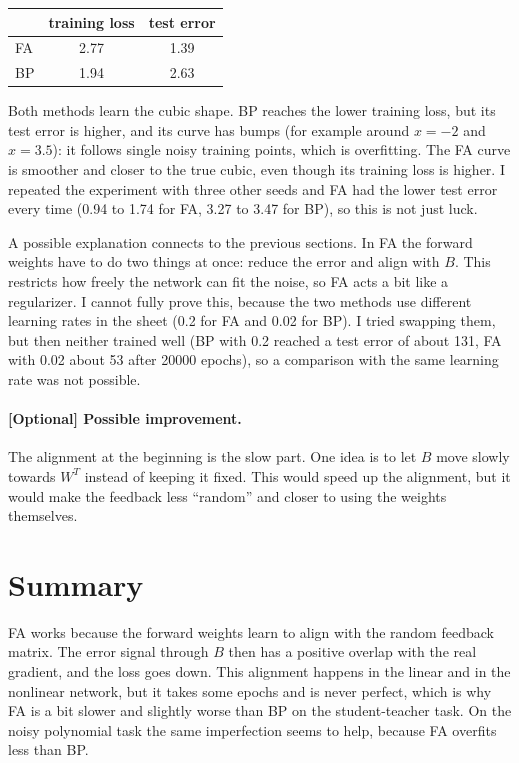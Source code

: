 \documentclass{article}
\begin{document}
\begin{center}
\begin{tabular}{lcc}
\toprule
 & training loss & test error \\
\midrule
FA & 2.77 & 1.39 \\
BP & 1.94 & 2.63 \\
\bottomrule
\end{tabular}
\end{center}

Both methods learn the cubic shape. BP reaches the lower training loss, but its test error is higher, and its curve has bumps (for example around $x=-2$ and $x=3.5$): it follows single noisy training points, which is overfitting. 
The FA curve is smoother and closer to the true cubic, even though its training loss is higher. I repeated the experiment with three other seeds and FA had the lower test error every time (0.94 to 1.74 for FA, 3.27 to 3.47 for BP), so this is not just luck.

A possible explanation connects to the previous sections. In FA the forward weights have to do two things at once: reduce the error and align with $B$. This restricts how freely the network can fit the noise, so FA acts a bit like a regularizer. 
I cannot fully prove this, because the two methods use different learning rates in the sheet (0.2 for FA and 0.02 for BP). I tried swapping them, but then neither trained well (BP with 0.2 reached a test error of about 131, FA with 0.02 about 53 after 20000 epochs), so a comparison with the same learning rate was not possible.

\paragraph{[Optional] Possible improvement.} The alignment at the beginning is the slow part. One idea is to let $B$ move slowly towards $W^T$ instead of keeping it fixed. This would speed up the alignment, but it would make the feedback less ``random'' and closer to using the weights themselves.

\section*{Summary}

FA works because the forward weights learn to align with the random feedback matrix. 
The error signal through $B$ then has a positive overlap with the real gradient, and the loss goes down. 
This alignment happens in the linear and in the nonlinear network, but it takes some epochs and is never perfect, which is why FA is a bit slower and slightly worse than BP on the student-teacher task. 
On the noisy polynomial task the same imperfection seems to help, because FA overfits less than BP.
\end{document}
